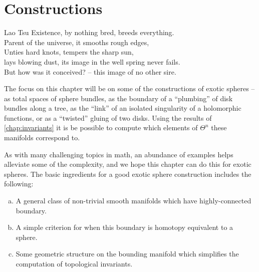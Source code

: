 \chapter{Constructions}\label{chap:constructions}

\begin{epigraph}{25em}{Lao Tsu}
Existence, by nothing bred, breeds everything.\\
Parent of the universe, it smooths rough edges,\\
Unties hard knots, tempers the sharp sun, \\
lays blowing dust, its image in the well spring never fails. \\
But how was it conceived? -- this image of no other sire.
\end{epigraph}

The focus on this chapter will be on some of the constructions of exotic spheres -- as total spaces of sphere bundles, as the boundary of a ``plumbing'' of disk bundles along a tree, as the ``link'' of an isolated singularity of a holomorphic functions, or as a ``twisted'' gluing of two disks. Using the results of \cref{chap:invariants} it is be possible to compute which elements of $\Theta^n$ these manifolds correspond to.

As with many challenging topics in math, an abundance of examples helps alleviate some of the complexity, and we hope this chapter can do this for exotic spheres.
The basic ingredients for a good exotic sphere construction includes the following:
\begin{enumerate}[(a)]
	\item A general class of non-trivial smooth manifolds which have highly-connected boundary.
	\item A simple criterion for when this boundary is homotopy equivalent to a sphere.
	\item Some geometric structure on the bounding manifold which simplifies the computation of topological invariants.
\end{enumerate}





